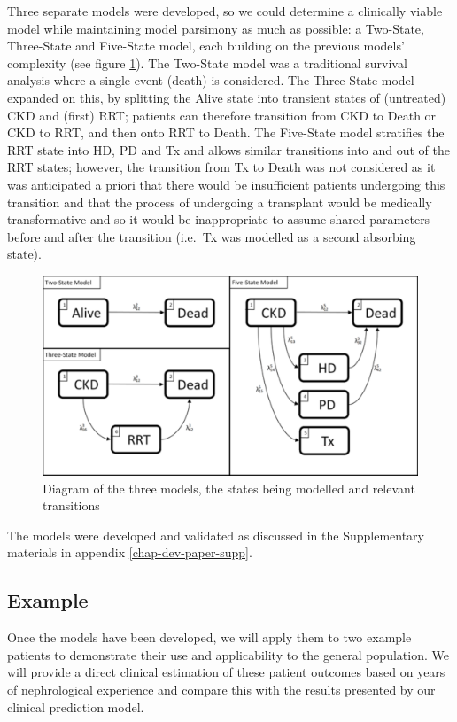 \documentclass[12pt,PhD,twoside,openright]{muthesis}
\begin{document}
Three separate models were developed, so we could determine a clinically viable model while maintaining model parsimony as much as possible: a Two-State, Three-State and Five-State model, each building on the previous models' complexity (see figure \ref{fig:State-Diagram}). The Two-State model was a traditional survival analysis where a single event (death) is considered. The Three-State model expanded on this, by splitting the Alive state into transient states of (untreated) CKD and (first) RRT; patients can therefore transition from CKD to Death or CKD to RRT, and then onto RRT to Death. The Five-State model stratifies the RRT state into HD, PD and Tx and allows similar transitions into and out of the RRT states; however, the transition from Tx to Death was not considered as it was anticipated a priori that there would be insufficient patients undergoing this transition and that the process of undergoing a transplant would be medically transformative and so it would be inappropriate to assume shared parameters before and after the transition (i.e.~Tx was modelled as a second absorbing state).
\begin{figure}

{\centering \includegraphics[width=0.9\linewidth]{figure/Dev_Paper_State_Diagrams} 

}

\caption{Diagram of the three models, the states being modelled and relevant transitions}\label{fig:State-Diagram}
\end{figure}
The models were developed and validated as discussed in the Supplementary materials in appendix \ref{chap-dev-paper-supp}.

\hypertarget{example}{%
\subsection{Example}\label{example}}

Once the models have been developed, we will apply them to two example patients to demonstrate their use and applicability to the general population. We will provide a direct clinical estimation of these patient outcomes based on years of nephrological experience and compare this with the results presented by our clinical prediction model.
\end{document}
